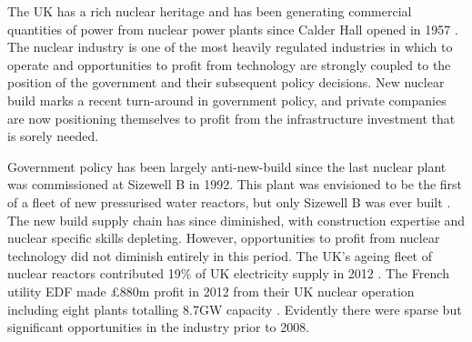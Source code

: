 {}

The UK has a rich nuclear heritage and has been generating commercial quantities of power from nuclear power plants since Calder Hall opened in 1957 \cite{NDA2007}. 
The nuclear industry is one of the most heavily regulated industries in which to operate and opportunities to profit from technology are strongly coupled to the position of the government and their subsequent policy decisions. 
New nuclear build marks a recent turn-around in government policy, and private companies are now positioning themselves to profit from the infrastructure investment that is sorely needed.

Government policy has been largely anti-new-build since the last nuclear plant was commissioned at Sizewell B in 1992. 
This plant was envisioned to be the first of a fleet of new pressurised water reactors, but only Sizewell B was ever built \cite{WNA2014}. 
The new build supply chain has since diminished, with construction expertise and nuclear specific skills depleting.
However, opportunities to profit from nuclear technology did not diminish entirely in this period. 
The UK's ageing fleet of nuclear reactors contributed 19\% of UK electricity supply in 2012 \cite{WNA2014}.  
The French utility EDF made \pounds880m profit in 2012 from their UK nuclear operation including eight plants totalling 8.7GW capacity \cite{EDF2012}. 
Evidently there were sparse but significant opportunities in the industry prior to 2008.

